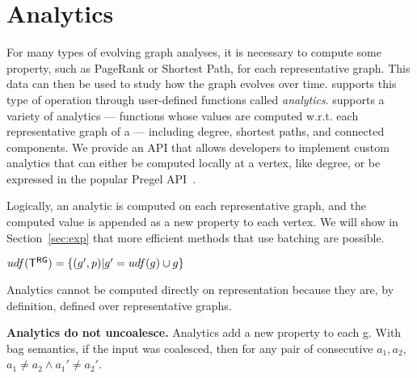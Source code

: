 \section{Analytics}
\label{sec:analytics}

For many types of evolving graph analyses, it is necessary to compute
some property, such as PageRank or Shortest Path, for each
representative graph.  This data can then be used to study how the
graph evolves over time.  \ql supports this type of operation through
user-defined functions called {\em analytics}.  \ql supports a variety
of \rg analytics --- functions whose values are computed w.r.t. each
representative graph of a \tg --- including degree, shortest paths,
and connected components.  We provide an API that allows developers to
implement custom analytics that can either be computed locally at a
vertex, like degree, or be expressed in the popular Pregel
API~\cite{DBLP:conf/sigmod/MalewiczABDHLC10}.

Logically, an analytic is computed on each representative graph, and
the computed value is appended as a new property to each vertex.  We
will show in Section~\ref{sec:exp} that more efficient methods that
use batching are possible.

$udf(\mathsf{T^{RG}}) = \{ (g', p) | g' = udf(g) \cup g\}$

Analytics cannot be computed directly on \ve representation because
they are, by definition, defined over representative graphs.

{\bf Analytics do not uncoalesce.} Analytics add a new property to
each g.  With bag semantics, if the input was coalesced, then for any
pair of consecutive $a_1, a_2$, $a_1 \neq a_2 \wedge a_1' \neq a_2'$.



